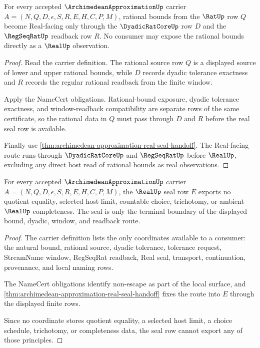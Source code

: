 \begin{theorem}
\label{thm:archimedean-approximation-dyadic-readback}
For every accepted $\ArchimedeanApproximationUp$ carrier $A=(N,Q,D,\epsilon,S,R,E,H,C,P,M)$, rational bounds from the $\RatUp$ row $Q$ become Real-facing only through the $\DyadicRatCoreUp$ row $D$ and the $\RegSeqRatUp$ readback row $R$. No consumer may expose the rational bounds directly as a $\RealUp$ observation.
\end{theorem}
\begin{proof}
Read the carrier definition. The rational source row $Q$ is a displayed source of lower and upper rational bounds, while $D$ records dyadic tolerance exactness and $R$ records the regular rational readback from the finite window.

Apply the NameCert obligations. Rational-bound exposure, dyadic tolerance exactness, and window-readback compatibility are separate rows of the same certificate, so the rational data in $Q$ must pass through $D$ and $R$ before the real seal row is available.

Finally use \autoref{thm:archimedean-approximation-real-seal-handoff}. The Real-facing route runs through $\DyadicRatCoreUp$ and $\RegSeqRatUp$ before $\RealUp$, excluding any direct host read of rational bounds as real observations.
\end{proof}

\begin{theorem}
\label{thm:archimedean-approximation-real-seal-nonescape}
For every accepted $\ArchimedeanApproximationUp$ carrier $A=(N,Q,D,\epsilon,S,R,E,H,C,P,M)$, the $\RealUp$ seal row $E$ exports no quotient equality, selected host limit, countable choice, trichotomy, or ambient $\RealUp$ completeness. The seal is only the terminal boundary of the displayed bound, dyadic, window, and readback route.
\end{theorem}
\begin{proof}
The carrier definition lists the only coordinates available to a consumer: the natural bound, rational source, dyadic tolerance, tolerance request, StreamName window, RegSeqRat readback, Real seal, transport, continuation, provenance, and local naming rows.

The NameCert obligations identify non-escape as part of the local surface, and \autoref{thm:archimedean-approximation-real-seal-handoff} fixes the route into $E$ through the displayed finite rows.

Since no coordinate stores quotient equality, a selected host limit, a choice schedule, trichotomy, or completeness data, the seal row cannot export any of those principles.
\end{proof}

